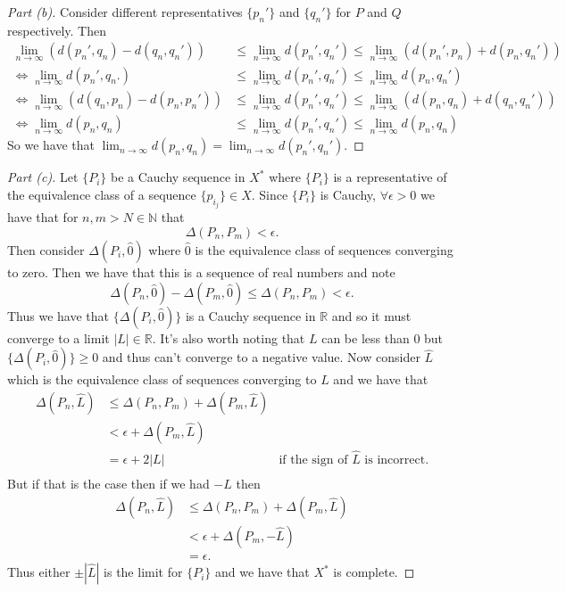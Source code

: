 \documentclass[leqno]{article}
\theoremstyle{nonumberplain}
\newtheorem{proof}{Proof}
\begin{document}
\begin{proof}[Part (b)]
Consider different representatives $\{p_n'\}$ and $\{q_n'\}$ for $P$ and $Q$ respectively. Then
\begin{align*}
\lim_{n\to \infty}(d(p_n',q_n)-d(q_n,q_n'))&\le \lim_{n\to \infty}d(p_n',q_n')\le \lim_{n\to \infty}(d(p_n',p_n)+d(p_n,q_n'))\\
\iff \lim_{n\to \infty}d(p_n',q_n.)&\le \lim_{n\to \infty}d(p_n',q_n')\le \lim_{n\to\infty}d(p_n,q_n')\\
\iff \lim_{n \to \infty}(d(q_n,p_n)-d(p_n,p_n'))&\le \lim_{n\to\infty}d(p_n',q_n')\le \lim_{n\to \infty}(d(p_n,q_n)+d(q_n,q_n'))\\
\iff \lim_{n\to\infty}d(p_n,q_n)&\le \lim_{n\to \infty} d(p_n',q_n')\le \lim_{n\to\infty}d(p_n,q_n)
\end{align*}
So we have that $\lim_{n\to \infty}d(p_n,q_n)=\lim_{n\to\infty}d(p_n',q_n')$.
\end{proof}

\begin{proof}[Part (c)]
Let $\{P_i\}$ be a Cauchy sequence in $X^*$ where $\{P_i\}$ is a representative of the equivalence class of a sequence $\{p_{i_j}\}\in X$. Since $\{P_i\}$ is Cauchy, $\forall \epsilon >0$ we have that for $n,m>N\in\mathbb{N}$ that
\[
\Delta(P_n,P_m)<\epsilon.
\]
Then consider $\Delta(P_i,\hat{0})$ where $\hat{0}$ is the equivalence class of sequences converging to zero. Then we have that this is a sequence of real numbers and note
\[
\Delta(P_n,\hat{0})-\Delta(P_m,\hat{0})\leq \Delta(P_n,P_m)<\epsilon.
\]
Thus we have that $\{\Delta(P_i,\hat{0})\}$ is a Cauchy sequence in $\mathbb{R}$ and so it must converge to a limit $|L|\in \mathbb{R}$. It's also worth noting that $L$ can be less than $0$ but $\{\Delta(P_i,\hat{0})\}\geq 0$ and thus can't converge to a negative value. Now consider $\hat{L}$ which is the equivalence class of sequences converging to $L$ and we have that
\begin{align*}
\Delta(P_n,\hat{L})&\leq \Delta(P_n,P_m)+\Delta(P_m,\hat{L})\\
&< \epsilon + \Delta(P_m,\hat{L})\\
&=\epsilon + 2|L| &\textrm{if the sign of $\hat{L}$ is incorrect}.\\
\end{align*}
But if that is the case then if we had $-\hat{L}$ then 
\begin{align*}
\Delta(P_n,\hat{L})&\leq \Delta(P_n,P_m)+\Delta(P_m,\hat{L})\\
&< \epsilon + \Delta(P_m,-\hat{L})\\
&=\epsilon.
\end{align*}
Thus either $\pm |\hat{L}|$ is the limit for $\{P_i\}$ and we have that $X^*$ is complete.
\end{proof}
\end{document}
